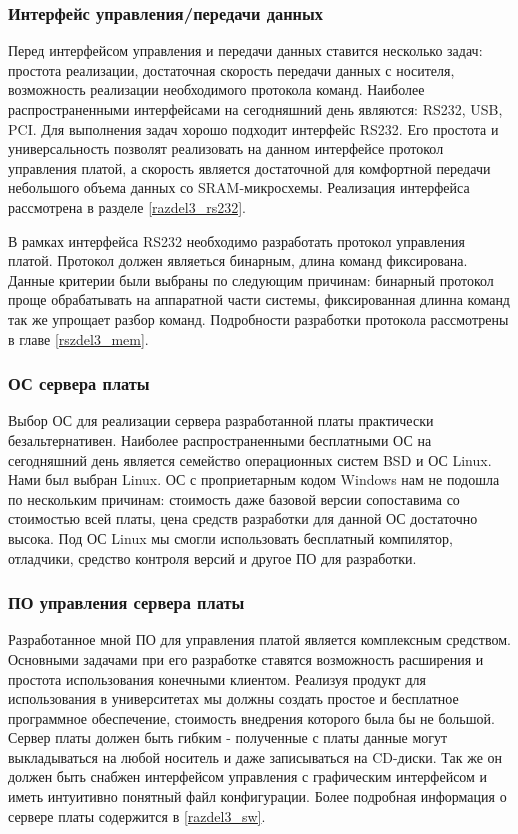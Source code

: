 \subsubsection{Интерфейс управления/передачи данных}
\label{razdel1_rs232}
Перед интерфейсом управления и передачи данных ставится несколько задач: простота реализации, достаточная скорость передачи данных с
носителя, возможность реализации необходимого протокола команд. Наиболее распространенными интерфейсами на сегодняшний день
являются: RS232, USB, PCI. Для выполнения задач хорошо подходит интерфейс RS232. Его простота и универсальность позволят
реализовать на данном интерфейсе протокол управления платой, а скорость является достаточной для комфортной передачи 
небольшого объема данных со SRAM-микросхемы. Реализация интерфейса рассмотрена в разделе \ref{razdel3_rs232}.

В рамках интерфейса RS232 необходимо разработать протокол управления платой. Протокол должен являеться
бинарным, длина команд фиксирована.
Данные критерии были выбраны по следующим причинам: бинарный протокол проще обрабатывать на аппаратной части системы,
фиксированная длинна команд так же упрощает разбор команд. 
Подробности разработки протокола рассмотрены в главе \ref{rszdel3_mem}.

\subsubsection{ОС сервера платы}
\label{razdel1_os}
Выбор ОС для реализации сервера разработанной платы практически безальтернативен. Наиболее распространенными бесплатными ОС
на сегодняшний день является семейство операционных систем BSD и ОС Linux. Нами был выбран Linux. ОС с проприетарным кодом Windows
нам не подошла по нескольким причинам: стоимость даже базовой версии сопоставима со стоимостью всей платы, цена средств разработки
для данной ОС достаточно высока. Под ОС Linux мы смогли использовать бесплатный компилятор, отладчики, средство контроля версий
и другое ПО для разработки.

\subsubsection{ПО управления сервера платы}
\label{razdel1_sw}
Разработанное мной ПО для управления платой является комплексным средством. Основными задачами при его разработке ставятся возможность
расширения и простота использования конечными клиентом. Реализуя продукт для использования в университетах мы должны создать
простое и бесплатное программное обеспечение, стоимость внедрения которого была бы не большой.
Сервер платы должен быть гибким - полученные с платы данные могут выкладываться на любой носитель и даже записываться на CD-диски.
Так же он должен быть снабжен интерфейсом управления с графическим интерфейсом и иметь интуитивно понятный файл конфигурации.
Более подробная информация о сервере платы содержится в \ref{razdel3_sw}.

\newpage
